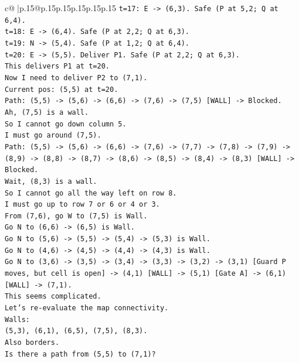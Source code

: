 \documentclass{article}
\begin{document}
{\begin{supertabular}{c@{$\;$}|p{.15\linewidth}@{}p{.15\linewidth}p{.15\linewidth}p{.15\linewidth}p{.15\linewidth}p{.15\linewidth}}
{{{\texttt{t=17: E {-}> (6,3). Safe (P at 5,2; Q at 6,4).} \\
\texttt{t=18: E {-}> (6,4). Safe (P at 2,2; Q at 6,3).} \\
\texttt{t=19: N {-}> (5,4). Safe (P at 1,2; Q at 6,4).} \\
\texttt{t=20: E {-}> (5,5). Deliver P1. Safe (P at 2,2; Q at 6,3).} \\
\texttt{This delivers P1 at t=20.} \\
\texttt{Now I need to deliver P2 to (7,1).} \\
\texttt{Current pos: (5,5) at t=20.} \\
\texttt{Path: (5,5) {-}> (5,6) {-}> (6,6) {-}> (7,6) {-}> (7,5) {[}WALL{]} {-}> Blocked.} \\
\texttt{Ah, (7,5) is a wall.} \\
\texttt{So I cannot go down column 5.} \\
\texttt{I must go around (7,5).} \\
\texttt{Path: (5,5) {-}> (5,6) {-}> (6,6) {-}> (7,6) {-}> (7,7) {-}> (7,8) {-}> (7,9) {-}> (8,9) {-}> (8,8) {-}> (8,7) {-}> (8,6) {-}> (8,5) {-}> (8,4) {-}> (8,3) {[}WALL{]} {-}> Blocked.} \\
\texttt{Wait, (8,3) is a wall.} \\
\texttt{So I cannot go all the way left on row 8.} \\
\texttt{I must go up to row 7 or 6 or 4 or 3.} \\
\texttt{From (7,6), go W to (7,5) is Wall.} \\
\texttt{Go N to (6,6) {-}> (6,5) is Wall.} \\
\texttt{Go N to (5,6) {-}> (5,5) {-}> (5,4) {-}> (5,3) is Wall.} \\
\texttt{Go N to (4,6) {-}> (4,5) {-}> (4,4) {-}> (4,3) is Wall.} \\
\texttt{Go N to (3,6) {-}> (3,5) {-}> (3,4) {-}> (3,3) {-}> (3,2) {-}> (3,1) {[}Guard P moves, but cell is open{]} {-}> (4,1) {[}WALL{]} {-}> (5,1) {[}Gate A{]} {-}> (6,1) {[}WALL{]} {-}> (7,1).} \\
\texttt{This seems complicated.} \\
\texttt{Let's re{-}evaluate the map connectivity.} \\
\texttt{Walls:} \\
\texttt{(5,3), (6,1), (6,5), (7,5), (8,3).} \\
\texttt{Also borders.} \\
\texttt{Is there a path from (5,5) to (7,1)?} \\
}}}
\end{supertabular}}
\end{document}

